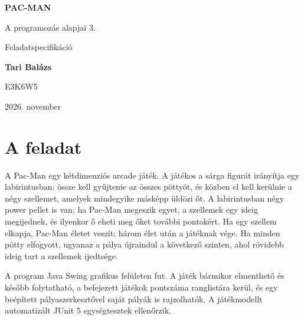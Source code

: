 \documentclass[11pt, a4paper]{article}
\begin{document}
\begin{titlepage}
    \centering
    \vspace*{4cm}
    {\Huge \textbf{PAC-MAN} \par}
    \vspace{1.5cm}
    {\LARGE A programozás alapjai 3. \par}
    \vspace{0.5cm}
    {\Large Feladatspecifikáció \par}
    \vspace{4.5cm}
    {\Large \textbf{Tari Balázs} \par}
    \vspace{0.3cm}
    {\Large E3K6W5 \par}
    \vfill
    {\large 2026. november \par}
\end{titlepage}

\tableofcontents
\newpage
\sloppy

\section{A feladat}
A Pac-Man egy kétdimenziós arcade játék. A játékos a sárga figurát irányítja egy labirintusban: össze kell gyűjtenie az összes pöttyöt, és közben el kell kerülnie a négy szellemet, amelyek mindegyike másképp üldözi őt. A labirintusban négy power pellet is van; ha Pac-Man megeszik egyet, a szellemek egy ideig megijednek, és ilyenkor ő eheti meg őket további pontokért. Ha egy szellem elkapja, Pac-Man életet veszít; három élet után a játéknak vége. Ha minden pötty elfogyott, ugyanaz a pálya újraindul a következő szinten, ahol rövidebb ideig tart a szellemek ijedtsége.

A program Java Swing grafikus felületen fut. A játék bármikor elmenthető és később folytatható, a befejezett játékok pontszáma ranglistára kerül, és egy beépített pályaszerkesztővel saját pályák is rajzolhatók. A játékmodellt automatizált JUnit 5 egységtesztek ellenőrzik.

\end{document}
